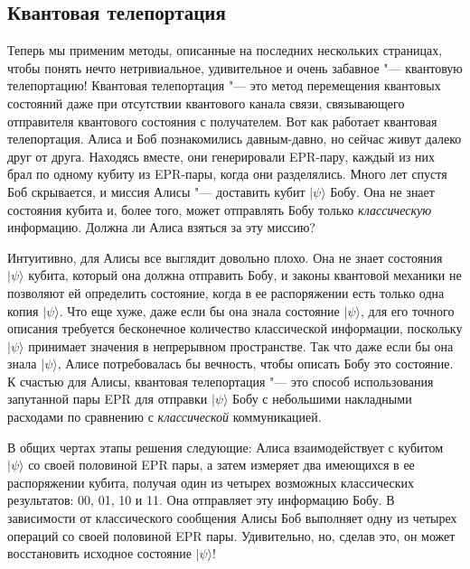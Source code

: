 \begin{multicols}{2}
    \section*{Квантовая телепортация}
    \normalsize{
        Теперь мы применим методы, описанные на последних нескольких страницах, чтобы понять нечто нетривиальное, удивительное и очень забавное "--- квантовую телепортацию! Квантовая телепортация "--- это
        метод перемещения квантовых состояний даже при отсутствии квантового канала связи, связывающего отправителя квантового состояния с получателем.
        Вот как работает квантовая телепортация. Алиса и Боб познакомились давным-давно, но сейчас живут
        далеко друг от друга. Находясь вместе, они генерировали EPR-пару, каждый из них брал по одному кубиту из EPR-пары, 
        когда они разделялись. Много лет спустя Боб скрывается, и миссия Алисы "--- 
        доставить кубит $\vert\psi\rangle$ Бобу. Она не знает состояния
        кубита и, более того, может отправлять Бобу только \emph{классическую} информацию. Должна ли Алиса взяться за эту миссию?

        Интуитивно, для Алисы все выглядит довольно плохо. Она не знает состояния $\vert\psi\rangle$
        кубита, который она должна отправить Бобу, и законы квантовой механики не позволяют ей
        определить состояние, когда в ее распоряжении есть только одна копия $\vert\psi\rangle$. Что еще
        хуже, даже если бы она знала состояние $\vert\psi\rangle$, для его точного описания требуется бесконечное количество
        классической информации, поскольку $\vert\psi\rangle$ принимает значения в непрерывном пространстве. Так что даже если бы она
        знала $\vert\psi\rangle$, Алисе потребовалась бы вечность, чтобы описать Бобу это состояние. 
        К счастью для Алисы, квантовая телепортация "--- это способ использования
        запутанной пары EPR для отправки $\vert\psi\rangle$ Бобу с небольшими накладными расходами по сравнению с \emph{классической}
        коммуникацией.

        В общих чертах этапы решения следующие: Алиса взаимодействует с кубитом $\vert\psi\rangle$ со
        своей половиной EPR пары, а затем измеряет два имеющихся в ее распоряжении кубита, получая
        один из четырех возможных классических результатов: 00, 01, 10 и 11. Она отправляет эту информацию
        Бобу. В зависимости от классического сообщения Алисы Боб выполняет одну из четырех операций со своей
        половиной EPR пары. Удивительно, но, сделав это, он может восстановить исходное состояние $\vert\psi\rangle!$

}
\end{multicols}
